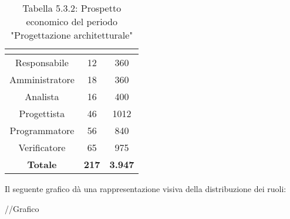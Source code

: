 \renewcommand{\arraystretch}{1.5}
\begin{table}[H]
\begin{center}
\begin{tabular}{|c|c|c|}
\hline
\rowcolor{title_row}
\textbf{\color{title_text}{Ruolo}}  & \textbf{\color{title_text}{Ore}} & \textbf{\color{title_text}{Costo in \euro}} \\ \hline
Responsabile    & 12              & 360                     \\ \hline
Amministratore  & 18              & 360                   \\ \hline
Analista        & 16              & 400                    \\ \hline
Progettista     & 46              & 1012                     \\ \hline
Programmatore   & 56              & 840                     \\ \hline
Verificatore    & 65              & 975                    \\ \hline
\textbf{Totale} & \textbf{217}    & \textbf{3.947}         \\ \hline
\end{tabular}
\caption{Tabella 5.3.2: Prospetto economico del periodo "Progettazione architetturale"\label{}}
\end{center}
\end{table}
\renewcommand{\arraystretch}{1}

Il seguente grafico dà una rappresentazione visiva della distribuzione dei ruoli: \\
\begin{center}
//Grafico
\end{center}

\pagebreak